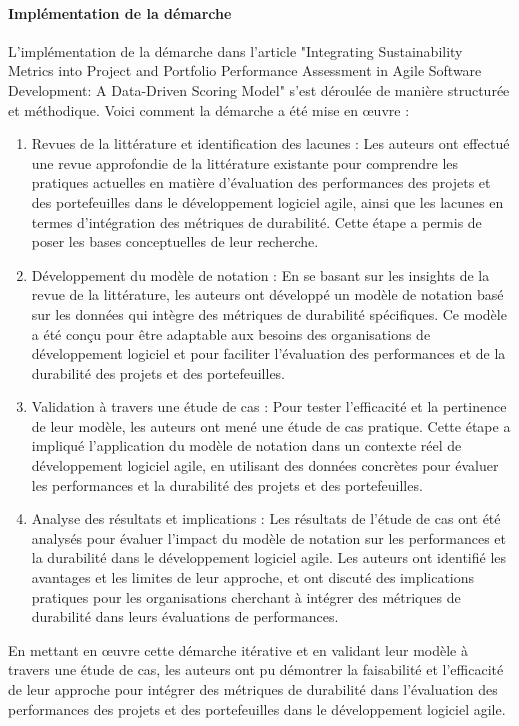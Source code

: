 \paragraph{Implémentation de la démarche}
L'implémentation de la démarche dans l'article "Integrating Sustainability Metrics into Project and Portfolio Performance Assessment in Agile Software Development: A Data-Driven Scoring Model" s'est déroulée de manière structurée et méthodique. Voici comment la démarche a été mise en œuvre :
\begin{enumerate}
    \item Revues de la littérature et identification des lacunes : Les auteurs ont effectué une revue approfondie de la littérature existante pour comprendre les pratiques actuelles en matière d'évaluation des performances des projets et des portefeuilles dans le développement logiciel agile, ainsi que les lacunes en termes d'intégration des métriques de durabilité. Cette étape a permis de poser les bases conceptuelles de leur recherche.
    \item Développement du modèle de notation : En se basant sur les insights de la revue de la littérature, les auteurs ont développé un modèle de notation basé sur les données qui intègre des métriques de durabilité spécifiques. Ce modèle a été conçu pour être adaptable aux besoins des organisations de développement logiciel et pour faciliter l'évaluation des performances et de la durabilité des projets et des portefeuilles.
    \item Validation à travers une étude de cas : Pour tester l'efficacité et la pertinence de leur modèle, les auteurs ont mené une étude de cas pratique. Cette étape a impliqué l'application du modèle de notation dans un contexte réel de développement logiciel agile, en utilisant des données concrètes pour évaluer les performances et la durabilité des projets et des portefeuilles.
    \item Analyse des résultats et implications : Les résultats de l'étude de cas ont été analysés pour évaluer l'impact du modèle de notation sur les performances et la durabilité dans le développement logiciel agile. Les auteurs ont identifié les avantages et les limites de leur approche, et ont discuté des implications pratiques pour les organisations cherchant à intégrer des métriques de durabilité dans leurs évaluations de performances.
\end{enumerate}
En mettant en œuvre cette démarche itérative et en validant leur modèle à travers une étude de cas, les auteurs ont pu démontrer la faisabilité et l'efficacité de leur approche pour intégrer des métriques de durabilité dans l'évaluation des performances des projets et des portefeuilles dans le développement logiciel agile.

